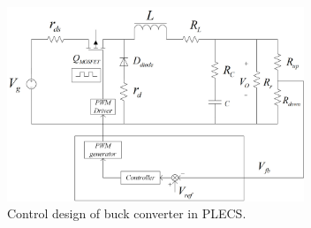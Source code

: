 \documentclass[journal]{IEEEtran}
\begin{document}
\begin{figure}
	\begin{center}
		\includegraphics[width=3.5in]{picture/str.jpg}
		\caption{Control design of buck converter in PLECS.}\label{fig:feedback}
	\end{center}
\end{figure}
\end{document}
